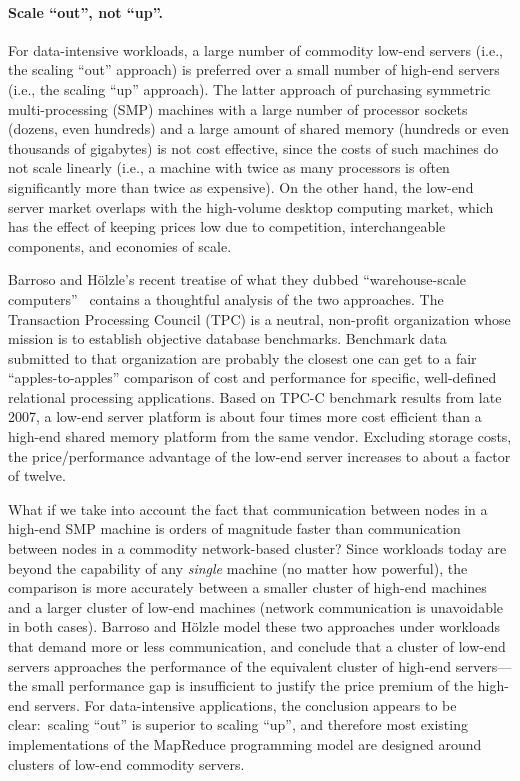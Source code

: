 \paragraph{Scale ``out'', not ``up''.}
For data-intensive workloads, a large number of commodity low-end
servers (i.e., the scaling ``out'' approach) is preferred over a small
number of high-end servers (i.e., the scaling ``up'' approach).  The
latter approach of purchasing symmetric multi-processing (SMP)
machines with a large number of processor sockets (dozens, even
hundreds) and a large amount of shared memory (hundreds or even
thousands of gigabytes) is not cost effective, since the costs of such
machines do not scale linearly (i.e., a machine with twice as many
processors is often significantly more than twice as expensive).  On
the other hand, the low-end server market overlaps with the
high-volume desktop computing market, which has the effect of keeping
prices low due to competition, interchangeable components, and
economies of scale.

Barroso and H\"{o}lzle's recent treatise of what they dubbed
``warehouse-scale computers''~\cite{Barroso_Holzle_2009} contains a
thoughtful analysis of the two approaches.  The Transaction Processing
Council (TPC) is a neutral, non-profit organization whose mission is
to establish objective database benchmarks.  Benchmark data submitted
to that organization are probably the closest one can get to a fair
``apples-to-apples'' comparison of cost and performance for specific,
well-defined relational processing applications.  Based on
\mbox{TPC-C} benchmark results from late 2007, a low-end server
platform is about four times more cost efficient than a high-end
shared memory platform from the same vendor.  Excluding storage costs,
the price/performance advantage of the low-end server increases to
about a factor of twelve.

What if we take into account the fact that communication between nodes
in a high-end SMP machine is orders of magnitude faster than
communication between nodes in a commodity network-based cluster?
Since workloads today are beyond the capability of any \emph{single}
machine (no matter how powerful), the comparison is more accurately
between a smaller cluster of high-end machines and a larger cluster of
low-end machines (network communication is unavoidable in both cases).
Barroso and H\"{o}lzle model these two approaches under workloads that
demand more or less communication, and conclude that a cluster of
low-end servers approaches the performance of the equivalent cluster
of high-end servers---the small performance gap is insufficient to
justify the price premium of the high-end servers.  For data-intensive
applications, the conclusion appears to be clear:\ scaling ``out'' is
superior to scaling ``up'', and therefore most existing
implementations of the MapReduce programming model are designed around
clusters of low-end commodity servers.

